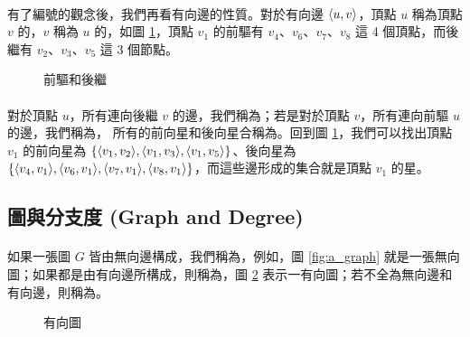 \documentclass[12pt,a4paper,oneside]{report}
\begin{document}
\begin{CJK}{UTF8}{bkai}
\paragraph{}有了編號的觀念後，我們再看有向邊的性質。對於有向邊 $\langle{}{{u},{v}}\rangle{}$，頂點 $u$ 稱為頂點 $v$ 的，$v$ 稱為 $u$ 的，如圖 \ref{fig:graph_star}，頂點 $v_1$ 的前驅有 $v_4$、$v_6$、$v_7$、$v_8$ 這 4 個頂點，而後繼有 $v_2$、$v_3$、$v_5$ 這 3 個節點。
\begin{figure}[h!]
\centering
{}
\caption{前驅和後繼}
\label{fig:graph_star}
\end{figure}

\paragraph{}對於頂點 $u$，所有連向後繼 $v$ 的邊，我們稱為\textbf{}；若是對於頂點 $v$，所有連向前驅 $u$ 的邊，我們稱為， 所有的前向星和後向星合稱為。回到圖 \ref{fig:graph_star}，我們可以找出頂點 $v_1$ 的前向星為 $\{\langle{}{{v_1},{v_2}}\rangle{},\langle{}{{v_1},{v_3}}\rangle{},\langle{}{{v_1},{v_5}}\rangle{}\}$、後向星為 $\{{\langle{}{{v_4},{v_1}}\rangle{},\langle{}{{v_6},{v_1}}\rangle{},\langle{}{{v_7},{v_1}}\rangle{},\langle{}{{v_8},{v_1}}\rangle{}}\}$，而這些邊形成的集合就是頂點 $v_1$ 的星。

\subsection{圖與分支度 (Graph and Degree)}
\paragraph{}如果一張圖 $G$ 皆由無向邊構成，我們稱為\textbf{}，例如，圖 \ref{fig:a_graph} 就是一張無向圖；如果都是由有向邊所構成，則稱為\textbf{}，圖 \ref{fig:directed_graph} 表示一有向圖；若不全為無向邊和有向邊，則稱為。
\begin{figure}[h!]
\centering
{}
\caption{有向圖}
\label{fig:directed_graph}
\end{figure}


\end{CJK}
\end{document}
